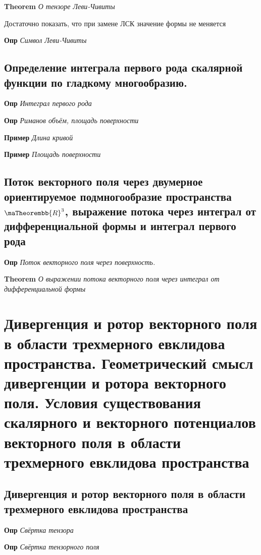 \documentclass[a4paper, 14pt]{article}
\begin{document}
    \textbf{Theorem} \textit{О тензоре Леви-Чивиты}
    
    Достаточно показать, что при замене ЛСК значение формы не меняется
    
    \textbf{Опр} \textit{Символ Леви-Чивиты}
    
    \subsection{Определение интеграла первого рода скалярной функции по гладкому многообразию.}
    
    \textbf{Опр} \textit{Интеграл первого рода}
    
    \textbf{Опр} \textit{Риманов объём, площадь поверхности}
    
    \textbf{Пример} \textit{Длина кривой}
    
    \textbf{Пример} \textit{Площадь поверхности}
    
    \subsection{Поток векторного поля через двумерное ориентируемое подмногообразие пространства $\maTheorembb{R}^3$,
        выражение потока через интеграл от дифференциальной формы и интеграл первого рода}
    
    \textbf{Опр} \textit{Поток векторного поля через поверхность.}
    
    \textbf{Theorem} \textit{О выражении потока векторного поля через интеграл от дифференциальной формы}
    
    \section{Дивергенция и ротор векторного поля в области трехмерного евклидова пространства.
    Геометрический смысл дивергенции и ротора векторного поля.
    Условия существования скалярного и векторного потенциалов векторного поля в области трехмерного евклидова
    пространства}
    
    \subsection{Дивергенция и ротор векторного поля в области трехмерного евклидова пространства}
    
    \textbf{Опр} \textit{Свёртка тензора}
    
    \textbf{Опр} \textit{Свёртка тензорного поля}
    
\end{document}
